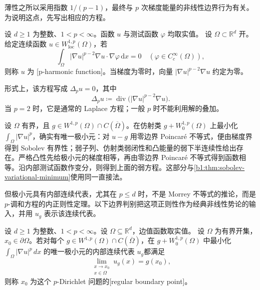 
薄性之所以采用指数 \(1/(p-1)\)，最终与 \(p\) 次梯度能量的非线性边界行为有关。为说明这点，先写出相应的方程。

\begin{definition}\label{b1:def:p-harmonic}
设 \(d\geq1\) 为整数、\(1<p<\infty\)。函数 \(u\) 与测试函数 \(\varphi\) 均取实值。
设 \(\Omega\subset\mathbb R^d\) 开。给定连续函数 \(u\in W_{\mathrm{loc}}^{1,p}(\Omega)\)，若
\[
 \int_\Omega |\nabla u|^{p-2}\nabla u\cdot\nabla\varphi\,\mathrm dx=0
 \quad(\varphi\in C_c^\infty(\Omega)),
\]
则称 \(u\) 为 [p-harmonic function]。当梯度为零时，向量 \( |\nabla u|^{p-2}\nabla u\) 约定为零。
\end{definition}

形式上，该方程写成 \(\Delta_pu=0\)，其中
\[
 \Delta_pu\coloneqq\operatorname{div}\bigl(|\nabla u|^{p-2}\nabla u\bigr).
\]
当 \(p=2\) 时，它是通常的 Laplace 方程；一般 \(p\) 时不能利用解的叠加。

\ProseParagraphBreak

设 \(\Omega\) 有界，且 \(g\in W^{1,p}(\Omega)\cap C(\overline\Omega)\)。在仿射类 \(g+W_0^{1,p}(\Omega)\) 上最小化 \(\int_\Omega|\nabla u|^p\)，确实有唯一极小元：对 \(u-g\) 用零边界 Poincaré 不等式，便由梯度界得到 Sobolev 有界性；弱子列、仿射类弱闭性和凸能量的弱下半连续性给出存在。严格凸性先给极小元的梯度相等，再由零边界 Poincaré 不等式得到函数相等。沿内部测试函数作变分，则得到上面的弱方程。这部分与\cref{b1:thm:sobolev-variational-minimum}使用同一直接法。

\ProseParagraphBreak

但极小元具有内部连续代表，尤其在 \(p\le d\) 时，不是 Morrey 不等式的推论，而是 \(p\)-调和方程的内正则性定理。以下边界判别把这项正则性作为经典非线性势论的输入，并用 \(u_g\) 表示该连续代表。

\begin{definition}\label{b1:def:p-dirichlet-regular-point}
设 \(d\geq1\) 为整数、\(1<p<\infty\)。设 \(\Omega\subseteq\mathbb R^d\)，边值函数取实值。
设 \(\Omega\) 为有界开集，\(x_0\in\partial\Omega\)。若对每个 \(g\in W^{1,p}(\Omega)\cap C(\overline\Omega)\)，在 \(g+W_0^{1,p}(\Omega)\) 中最小化 \(\int_\Omega|\nabla u|^p\,dx\) 的唯一极小元的内部连续代表 \(u_g\)都满足
\[
 \lim_{\substack{x\to x_0\\x\in\Omega}}u_g(x)=g(x_0),
\]
则称 \(x_0\) 为这个 \(p\)-Dirichlet 问题的[regular boundary point]。
\end{definition}

